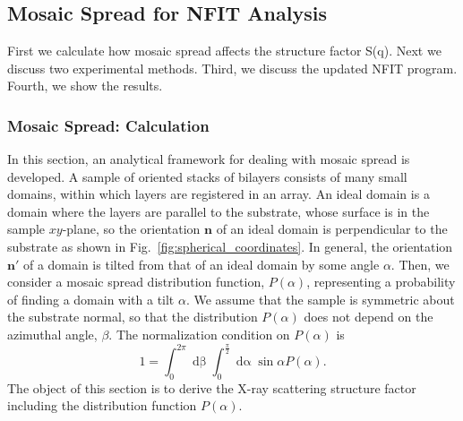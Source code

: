 \chapter{}
\section{Mosaic Spread for NFIT Analysis}
\label{sec:mosaic_spread}
First we calculate how mosaic spread affects the structure factor S(q). 
Next we discuss two experimental methods. Third, we discuss the updated NFIT program.
Fourth, we show the results.

\subsection{Mosaic Spread: Calculation}\label{app:mosaic_calc}
In this section, an analytical framework for dealing with mosaic spread is 
developed. A sample of oriented stacks of bilayers consists of many small domains, 
within which layers are registered in an array. 
An ideal domain is a domain where the layers are parallel to the substrate, whose
surface is in the sample $xy$-plane, so
the orientation $\mathbf{n}$ of an ideal domain is perpendicular
to the substrate as shown in Fig.~\ref{fig:spherical_coordinates}.
In general, the orientation $\mathbf{n'}$ of a domain is tilted from that of an
ideal domain by some angle $\alpha$. 
Then, we consider a mosaic spread distribution function, $P(\alpha)$, 
representing a probability of finding a domain with a tilt $\alpha$. 
We assume that the sample is symmetric about the substrate normal, 
so that the distribution $P(\alpha)$ does not depend on the azimuthal angle, $\beta$. 
The normalization condition on $P(\alpha)$ is 
\begin{equation}
  1 = \int_0^{2\pi}\mathop{d\beta}  
      \int_0^{\frac{\pi}{2}}\mathop{d\alpha}\sin\alpha P(\alpha).
\end{equation}
The object of this section is to derive the X-ray scattering structure factor 
including the distribution function $P(\alpha)$. 

